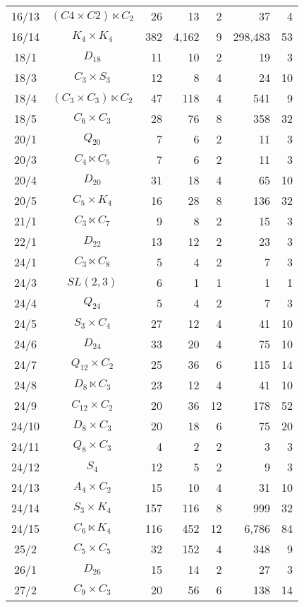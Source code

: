 \documentclass[a4paper,11pt]{article}
\theoremstyle{plain}
\theoremstyle{definition}
\begin{document}
\begin{longtable}{ccrrrrr}
	16/13 & $(C4 \times C2) \ltimes C_2$ & 26 & 13 & 2 & 37 & 4 \\ 
	16/14 & $K_4 \times K_4$ & 382 & 4,162 & 9 & 298,483 & 53  \\ 
	18/1 & $D_{18}$ & 11 & 10 & 2 & 19 & 3 \\ 
	18/3 & $C_3 \times S_3$ & 12 & 8 & 4 & 24 & 10 \\ 
	18/4 & $(C_3 \times C_3) \ltimes C_2$ & 47 & 118 & 4 & 541 & 9 \\ 
	18/5 & $C_6 \times C_3$ & 28 & 76 & 8 & 358 & 32 \\ 
	20/1 & $Q_{20}$ & 7 & 6 & 2 & 11 & 3 \\ 
	20/3 & $C_4 \ltimes C_5$ & 7 & 6 & 2 & 11 & 3 \\ 
	20/4 & $D_{20}$ & 31 & 18 & 4 & 65 & 10 \\ 
	20/5 & $C_5 \times K_4$ & 16 & 28 & 8 & 136 & 32 \\ 
	21/1 & $C_3 \ltimes C_7$ & 9 & 8 & 2 & 15 & 3 \\ 
	22/1 & $D_{22}$ & 13 & 12 & 2 & 23 & 3 \\ 
	24/1 & $C_3 \ltimes C_8$ & 5 & 4 & 2 & 7 & 3 \\ 
	24/3 & $SL(2,3)$ & 6 & 1 & 1 & 1 & 1 \\ 
	24/4 & $Q_{24}$ & 5 & 4 & 2 & 7 & 3 \\ 
	24/5 & $S_3 \times C_4$ & 27 & 12 & 4 & 41 & 10 \\ 
	24/6 & $D_{24}$ & 33 & 20 & 4 & 75 & 10 \\ 
	24/7 & $Q_{12} \times C_2$ & 25 & 36 & 6 & 115 & 14 \\ 
	24/8 & $D_8 \ltimes C_3$ & 23 & 12 & 4 & 41 & 10 \\ 
	24/9 & $C_{12} \times C_2$ & 20 & 36 & 12 & 178 & 52 \\ 
	24/10 & $D_8 \times C_3$ & 20 & 18 & 6 & 75 & 20 \\ 
	24/11 & $Q_8 \times C_3$ & 4 & 2 & 2 & 3 & 3 \\ 
	24/12 & $S_4$ & 12 & 5 & 2 & 9 & 3 \\ 
	24/13 & $A_4 \times C_2$ & 15 & 10 & 4 & 31 & 10 \\ 
	24/14 & $S_3 \times K_4$ & 157 & 116 & 8 & 999 & 32 \\ 
	24/15 & $C_6 \ltimes K_4$ & 116 & 452 & 12 & 6,786 & 84 \\ 
	25/2 & $C_5 \times C_5$ & 32 & 152 & 4 & 348 & 9 \\ 
	26/1 & $D_{26}$ & 15 & 14 & 2 & 27 & 3 \\ 
	27/2 & $C_9 \times C_3$ & 20 & 56 & 6 & 138 & 14 \\ 

\end{longtable}
\end{document}
